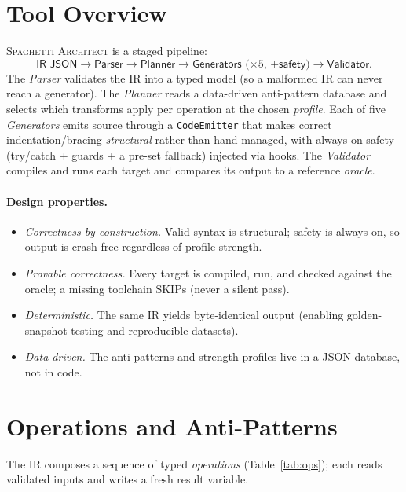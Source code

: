 \documentclass[sigconf,nonacm=false]{acmart}
\begin{document}
\section{Tool Overview}
\label{sec:overview}
\textsc{Spaghetti Architect} is a staged pipeline:
\[
\textsf{IR JSON} \rightarrow \textsf{Parser} \rightarrow \textsf{Planner}
\rightarrow \textsf{Generators ($\times 5$, +safety)} \rightarrow \textsf{Validator}.
\]
The \emph{Parser} validates the IR into a typed model (so a malformed IR can never
reach a generator). The \emph{Planner} reads a data-driven anti-pattern database and
selects which transforms apply per operation at the chosen \emph{profile}. Each of
five \emph{Generators} emits source through a \texttt{CodeEmitter} that makes correct
indentation/bracing \emph{structural} rather than hand-managed, with always-on safety
(try/catch + guards + a pre-set fallback) injected via hooks. The \emph{Validator}
compiles and runs each target and compares its output to a reference \emph{oracle}.

\paragraph{Design properties.}
\begin{itemize}
  \item \emph{Correctness by construction.} Valid syntax is structural; safety is
        always on, so output is crash-free regardless of profile strength.
  \item \emph{Provable correctness.} Every target is compiled, run, and checked
        against the oracle; a missing toolchain \textsf{SKIP}s (never a silent pass).
  \item \emph{Deterministic.} The same IR yields byte-identical output (enabling
        golden-snapshot testing and reproducible datasets).
  \item \emph{Data-driven.} The anti-patterns and strength profiles live in a JSON
        database, not in code.
\end{itemize}

\section{Operations and Anti-Patterns}
\label{sec:ops}
The IR composes a sequence of typed \emph{operations} (Table~\ref{tab:ops}); each
reads validated inputs and writes a fresh result variable.
\end{document}
